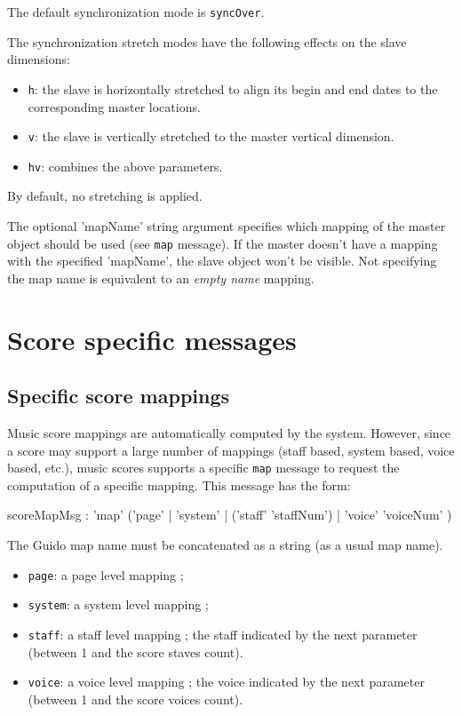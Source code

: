 \documentclass[a4paper,twoside]{report}
\newcommand{\toplevel}[1]	{\chapter{#1}}
\newcommand{\sublevel}[1]	{\section{#1}}
\newcommand{\OSC}[1]		{\texttt{#1}}
\begin{document}
The default synchronization mode is \OSC{syncOver}.

The synchronization stretch modes have the following effects on the slave dimensions:
\begin{itemize}
\item \OSC{h}: the slave is horizontally stretched to align its begin and end dates to the corresponding master locations.
\item \OSC{v}: the slave is vertically stretched to the master vertical dimension.
\item \OSC{hv}: combines the above parameters.
\end{itemize}
By default, no stretching is applied.

The optional 'mapName' string argument specifies which mapping of the master object should be used (see \OSC{map} message). If the master doesn't have a mapping with the specified 'mapName', the slave object won't be visible.
Not specifying the map name is equivalent to an \emph{empty name} mapping.


\toplevel{Score specific messages}

\sublevel{Specific score mappings}
\label{guidomaps}

Music score mappings are automatically computed  by the system. However, since a score may support a large number of mappings (staff based, system based, voice based, etc.), music scores supports a specific \OSC{map} message to request the computation of a specific mapping. This message has the form:
\begin{rail}
scoreMapMsg : 'map' ('page' | 'system' | ('staff' 'staffNum') | 'voice' 'voiceNum' )
\end{rail}

The Guido map name must be concatenated as a string (as a usual map name).

\begin{itemize}
\item \OSC{page}: a page level mapping ;
\item \OSC{system}: a system level mapping ;
\item \OSC{staff}: a staff level mapping ; the staff indicated by the next parameter (between 1 and the score staves count).
\item \OSC{voice}: a voice level mapping ; the voice indicated by the next parameter (between 1 and the score voices count).
\end{itemize}
\end{document}
